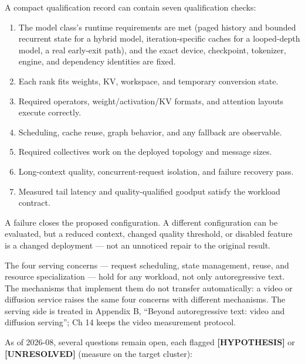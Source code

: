 A compact qualification record can contain seven qualification checks:

\begin{enumerate}
\def\labelenumi{\arabic{enumi}.}
\tightlist
\item
  The model class's runtime requirements are met (paged history and
  bounded recurrent state for a hybrid model, iteration-specific caches
  for a looped-depth model, a real early-exit path), and the exact
  device, checkpoint, tokenizer, engine, and dependency identities are
  fixed.
\item
  Each rank fits weights, KV, workspace, and temporary conversion state.
\item
  Required operators, weight/activation/KV formats, and attention
  layouts execute correctly.
\item
  Scheduling, cache reuse, graph behavior, and any fallback are
  observable.
\item
  Required collectives work on the deployed topology and message sizes.
\item
  Long-context quality, concurrent-request isolation, and failure
  recovery pass.
\item
  Measured tail latency and quality-qualified goodput satisfy the
  workload contract.
\end{enumerate}

A failure closes the proposed configuration. A different configuration
can be evaluated, but a reduced context, changed quality threshold, or
disabled feature is a changed deployment --- not an unnoticed repair to
the original result.

The four serving concerns --- request scheduling, state management,
reuse, and resource specialization --- hold for any workload, not only
autoregressive text. The mechanisms that implement them do not transfer
automatically: a video or diffusion service raises the same four
concerns with different mechanisms. The serving side is treated in
Appendix B, ``Beyond autoregressive text: video and diffusion serving'';
Ch 14 keeps the video measurement protocol.

\label{what-we-still-dont-know}


As of 2026-08, several questions remain open, each flagged
\textbf{\mbox{{[}HYPOTHESIS{]}}} or \textbf{\mbox{{[}UNRESOLVED{]}}} (measure on the
target cluster):

